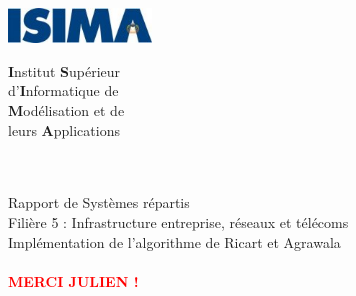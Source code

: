 \begin{titlepage}
	\begin{minipage}{0.5\textwidth}
		\begin{flushleft} \large
			\includegraphics[width=3.8cm]{images/logo-isima.jpg}\\
		\end{flushleft}
	\end{minipage}
	\begin{minipage}{0.43\textwidth}
		\begin{flushright} \large
		\end{flushright}
	\end{minipage}

	\begin{minipage}{0.5\textwidth}
		\begin{flushleft} \large
			\textbf{I}nstitut \textbf{S}upérieur\\
			d'\textbf{I}nformatique de\\
			\textbf{M}odélisation et de\\
			leurs \textbf{A}pplications\\
			~\\
		\end{flushleft}
	\end{minipage}
	\begin{minipage}{0.43\textwidth}
		\begin{flushright} \large
		\end{flushright}
	\end{minipage}


		\vfill
		\begin{center}
			\Hrule \\[0.4cm]
			\Large{Rapport de Systèmes répartis}\\		
			\Large Filière 5 : Infrastructure entreprise, réseaux et télécoms\\[1.0cm]
			\Huge{Implémentation de l'algorithme de Ricart et Agrawala}\\
			\Hrule\\[0.8cm]
\vfill 
\textcolor{red}{\Huge{\textbf{MERCI JULIEN !}}}
\vfill 
		\end{center}
		

\end{titlepage}
